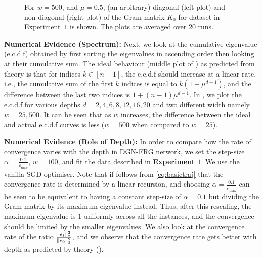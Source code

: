 \begin{figure}[h]
{\begin{tabular}{cc}
\end{tabular}
}
\caption{For $w=500$, and $\mu=0.5$, (an arbitrary) diagonal (left plot) and non-diagonal (right plot) of the Gram matrix $K_0$ for dataset in Experiment~$1$ is shown. The plots are averaged over $20$ runs.}
\label{fig:dgn-frg-gram-diag}
\end{figure}


\textbf{Numerical Evidence (Spectrum):} 
Next, we look at the cumulative eigenvalue (e.c.d.f) obtained by first sorting the eigenvalues in ascending order then looking at their cumulative sum. The ideal behaviour (middle plot of ) as predicted from theory is that for indices $k\in[n-1]$, the e.c.d.f should increase at a linear rate, i.e., the cumulative sum of the first $k$ indices is equal to $k(1-\mu^{d-1})$, and the difference between the last two indices is $1+(n-1)\mu^{d-1}$. In , we plot the e.c.d.f for various depths $d=2,4,6,8,12,16,20$ and two different width namely $w=25,500$. It can be seen that as $w$ increases, the difference between the ideal and actual e.c.d.f curves is less ($w=500$ when compared to $w=25$).

\textbf{Numerical Evidence (Role of Depth):} 
In order to compare how the rate of convergence varies with the depth in DGN-FRG network, we set the step-size $\alpha=\frac{0.1}{\rho_{\max}}$, $w=100$, and fit the data described in \textbf{Experiment $1$}. We use the vanilla SGD-optimiser. Note that if follows from \eqref{eq:basictraj} that the convergence rate is determined by a linear recursion, and choosing $\alpha=\frac{0.1}{\rho_{\max}}$ can be seen to be equivalent to having a constant step-size of $\alpha=0.1$ but dividing the Gram matrix by its maximum eigenvalue instead. Thus, after this rescaling, the maximum eigenvalue is $1$ uniformly across all the instances, and the convergence should be limited by the smaller eigenvalues. We also look at the convergence rate of the ratio $\frac{\|e_t\|^2_2}{\|e_0\|^2_2}$, and we observe that the convergence rate gets better with depth as predicted by theory ().

